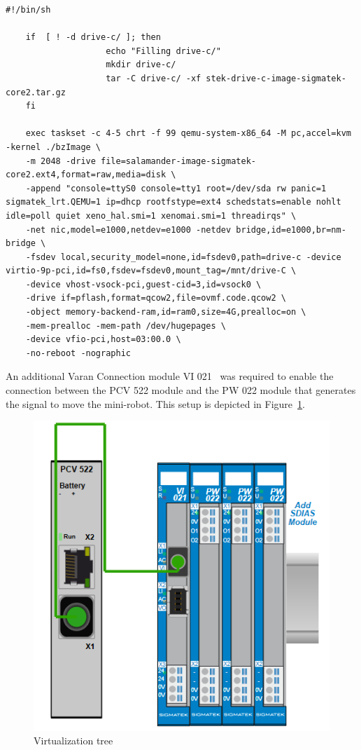 \documentclass[MMR,Master,english]{twbook}
\begin{document}
\vspace{1em}
\begin{minipage}{\linewidth}
	\begin{lstlisting}[name={Include PCI in QEMU script for Salamander 4 virtualization},label={script:qemu_def_pci}]
	#!/bin/sh

	if  [ ! -d drive-c/ ]; then
					echo "Filling drive-c/"
					mkdir drive-c/
					tar -C drive-c/ -xf stek-drive-c-image-sigmatek-core2.tar.gz
	fi
		
	exec taskset -c 4-5 chrt -f 99 qemu-system-x86_64 -M pc,accel=kvm -kernel ./bzImage \
	-m 2048 -drive file=salamander-image-sigmatek-core2.ext4,format=raw,media=disk \
	-append "console=ttyS0 console=tty1 root=/dev/sda rw panic=1 sigmatek_lrt.QEMU=1 ip=dhcp rootfstype=ext4 schedstats=enable nohlt idle=poll quiet xeno_hal.smi=1 xenomai.smi=1 threadirqs" \
	-net nic,model=e1000,netdev=e1000 -netdev bridge,id=e1000,br=nm-bridge \
	-fsdev local,security_model=none,id=fsdev0,path=drive-c -device virtio-9p-pci,id=fs0,fsdev=fsdev0,mount_tag=/mnt/drive-C \
	-device vhost-vsock-pci,guest-cid=3,id=vsock0 \
	-drive if=pflash,format=qcow2,file=ovmf.code.qcow2 \
	-object memory-backend-ram,id=ram0,size=4G,prealloc=on \
	-mem-prealloc -mem-path /dev/hugepages \
	-device vfio-pci,host=03:00.0 \
	-no-reboot -nographic
\end{lstlisting}
\end{minipage}

\noindent An additional Varan Connection module VI 021~\cite{InterfacesSplittersSIGMATEK} was required to enable the connection between the PCV 522 module and the PW 022 module that generates the signal to move the mini-robot. This setup is depicted in Figure~\ref{fig:virt_tree}.

\begin{figure}[H]
	\centering
	\includegraphics[width=0.5\columnwidth]{img/experiment/virt_tree.png}
	\caption[Virtualization tree]{Virtualization tree}
	\label{fig:virt_tree}
\end{figure}
\end{document}
